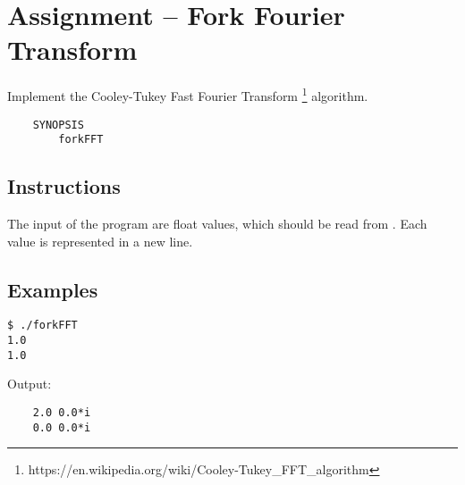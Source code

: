 
\usepackage{amsmath}



\section*{ Assignment -- Fork Fourier Transform}
Implement the Cooley-Tukey Fast Fourier Transform \footnote{https://en.wikipedia.org/wiki/Cooley-Tukey\_FFT\_algorithm} algorithm.
\begin{verbatim}
    SYNOPSIS
        forkFFT
\end{verbatim}

\subsection*{Instructions}
The input of the program are float values, which should be read from . Each value is represented in a new line.
\subsection*{Examples}
\begin{verbatim}
$ ./forkFFT
1.0
1.0
\end{verbatim}
Output: 
\begin{verbatim}
	2.0	0.0*i
	0.0	0.0*i
\end{verbatim}
